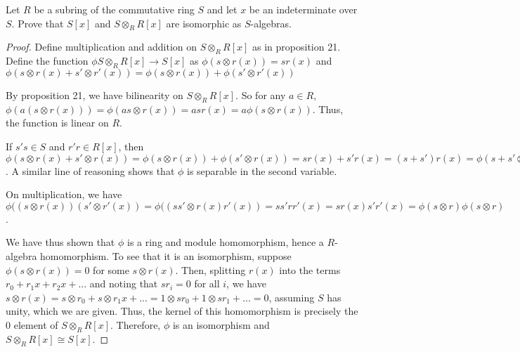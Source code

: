 \documentclass[10pt]{article}
\newenvironment{problem}[2][Problem]{\begin{trivlist}
		\item[\hskip \labelsep {\bfseries #1}\hskip \labelsep {\bfseries #2.}]}{\end{trivlist}}
\begin{document}
	\begin{problem}{4.25}
		Let $R$ be a subring of the commutative ring $S$ and let $x$ be an indeterminate over $S$. Prove that $S[x]$ and $S \otimes_R R[x]$ are isomorphic as $S$-algebras.
		\begin{proof}
			Define multiplication and addition on $S \otimes_R R[x]$ as in proposition 21. Define the function $\phi S \otimes_R R[x] \rightarrow S[x]$ as $\phi(s \otimes r(x)) = sr(x)$ and $\phi(s\otimes r(x) + s' \otimes r'(x)) = \phi(s\otimes r(x)) + \phi(s' \otimes r'(x))$
			
			By proposition 21, we have bilinearity on $S \otimes_R R[x]$. So for any $a \in R$, $\phi(a(s \otimes r(x))) = \phi(as \otimes r(x)) = asr(x) = a\phi(s \otimes r(x))$. Thus, the function is linear on $R$.
			
			If $s' s \in S$ and $r' r \in R[x]$, then $\phi(s \otimes r(x) + s' \otimes r(x)) = \phi(s \otimes r(x)) + \phi(s' \otimes r(x)) = sr(x) + s'r(x) = (s+s')r(x) = \phi(s+s' \otimes r(x))$. A similar line of reasoning shows that $\phi$ is separable in the second variable.
			
			On multiplication, we have $\phi((s\otimes r(x))(s'\otimes r'(x)) = \phi((ss'\otimes r(x)r'(x)) = ss'rr'(x) = sr(x)s'r'(x) = \phi(s \otimes r)\phi(s \otimes r)$.
			
			We have thus shown that $\phi$ is a ring and module homomorphism, hence a $R$-algebra homomorphism. To see that it is an isomorphism, suppose $\phi(s \otimes r(x)) = 0$ for some $s \otimes r(x)$. Then, splitting $r(x)$ into the terms $r_0 + r_1x + r_2x + ...$ and noting that $sr_i=0$ for all $i$, we have $s \otimes r(x) = s \otimes r_0 + s\otimes r_1x + ... = 1 \otimes sr_0 + 1 \otimes sr_1 + ... = 0$, assuming $S$ has unity, which we are given. Thus, the kernel of this homomorphism is precisely the $0$ element of $S \otimes_R R[x]$. Therefore, $\phi$ is an isomorphism and $S \otimes_R R[x] \cong S[x]$.
		\end{proof}
	\end{problem}
	
\end{document}
